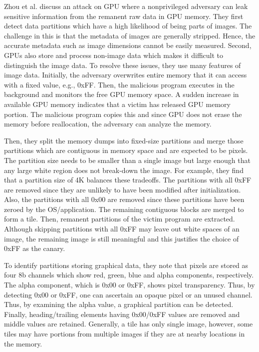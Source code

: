 Zhou et al. \cite{zhou2017vulnerable} discuss an attack on GPU where a nonprivileged adversary can leak sensitive information from the remanent raw data in GPU memory. They first detect data partitions which have a high likelihood of being parts of images. The challenge in this is that the metadata of images are generally stripped. Hence, the accurate metadata such as image dimensions cannot be easily measured. Second, GPUs also store and process non-image data which makes it difficult to distinguish the image data. To resolve these issues, they use many features of image data. Initially, the adversary overwrites entire memory that it can access with a fixed value, e.g., 0xFF. Then, the malicious program executes in the background and monitors the free GPU memory space. A sudden increase in available GPU memory indicates that a victim has released GPU memory portion. The malicious program copies this and since GPU does not erase the memory before reallocation, the adversary can analyze the memory.  

Then, they split the memory dumps into fixed-size partitions and merge those partitions which are contiguous in memory space and are expected to be pixels. The partition size needs to be smaller than a single image but large enough that any large white region does not break-down the image. For example, they find that a partition size of 4K balances these tradeoffs. The partitions with all 0xFF are removed since they are unlikely to have been modified after initialization. Also, the partitions with all 0x00 are removed since these partitions have been zeroed by the OS/application. The remaining contiguous blocks are merged to form a tile. Then, remanent partitions of the victim program are extracted. Although skipping partitions with all 0xFF may leave out white spaces of an image, the remaining image is still meaningful and this justifies the choice of 0xFF as the canary. 
     
To identify partitions storing graphical data, they note that pixels are stored as four 8b channels which show red, green, blue and alpha components, respectively. The alpha component, which is 0x00 or 0xFF, shows pixel transparency. Thus, by detecting 0x00 or 0xFF, one can ascertain an opaque pixel or an unused channel. Thus, by examining the alpha value, a graphical partition can be detected. Finally, heading/trailing elements having 0x00/0xFF values are removed and middle values are retained. Generally, a tile has only single image, however, some tiles may have portions from multiple images if they are at nearby locations in the memory.  
 
